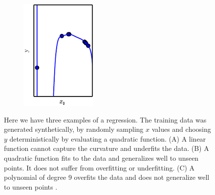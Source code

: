 \begin{figure}
\begin{subfigure}[b]{0.3\textwidth}
        \includegraphics[width=\textwidth]{Figures/overfit}
        \label{fig:five over x}
    \end{subfigure}
    \decoRule
    \caption[Underfitting and overfitting]{Here we have three examples of a regression. The training data was generated synthetically, by randomly sampling \(x\) values and choosing \(y\) deterministically by evaluating a quadratic function. (A) A linear function cannot capture the curvature and underfits the data. (B) A quadratic function fits to the data and generalizes well to unseen points. It does not suffer from overfitting or underfitting. (C) A polynomial of degree 9 overfits the data and does not generalize well to unseen points \parencite{deep-learning}.}
    \label{fig:overfit}
\end{figure}

